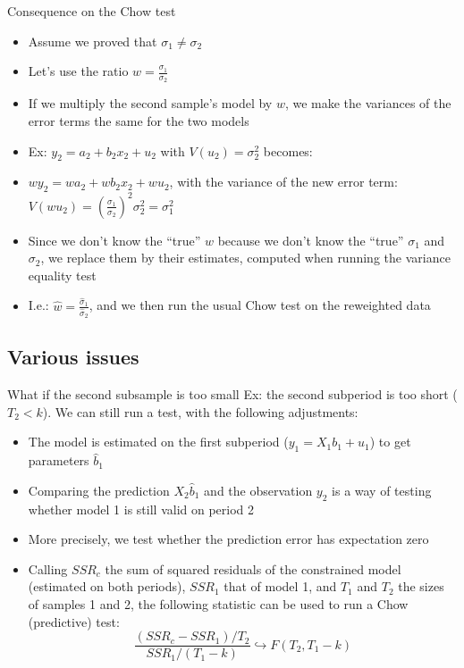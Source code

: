 \documentclass[aspectratio=169]{beamer}
\begin{document}
\begin{frame}{Consequence on the Chow test}
\begin{itemize}
    \item Assume we proved that $\sigma_1 \neq \sigma_2$
    \item Let's use the ratio $w = \frac{\sigma_1}{\sigma_2}$
    \item If we multiply the second sample's model by $w$, we make the variances of the error terms the same for the two models
    \item Ex: $y_2 = a_2 + b_2 x_2 + u_2$ with $V(u_2) = \sigma_2^2$ becomes:
    \item $w y_2 = w a_2 + w b_2 x_2 + w u_2$, with the variance of the new error term: $V(w u_2) = (\frac{\sigma_1}{\sigma_2})^2 \sigma_2^2 = \sigma_1^2$
    \item Since we don't know the ``true'' $w$ because we don't know the ``true'' $\sigma_1$ and $\sigma_2$, we replace them by their estimates, computed when running the variance equality test
    \item I.e.: $\hat{w} = \frac{\hat{\sigma}_1}{\hat{\sigma}_2}$, and we then run the usual Chow test on the reweighted data
\end{itemize}
\end{frame}

\subsection{Various issues}

\begin{frame}{What if the second subsample is too small}
Ex: the second subperiod is too short ($T_2 < k$). We can still run a test, with the following adjustments:

\begin{itemize}
    \item The model is estimated on the first subperiod ($y_1 = X_1 b_1 + u_1$) to get parameters $\hat{b}_1$
    \item Comparing the prediction $X_2\hat{b}_1$ and the observation $y_2$ is a way of testing whether model 1 is still valid on period 2
    \item More precisely, we test whether the prediction error has expectation zero
    \item Calling $SSR_c$ the sum of squared residuals of the constrained model (estimated on both periods), $SSR_1$ that of model 1, and $T_1$ and $T_2$ the sizes of samples 1 and 2, the following statistic can be used to run a Chow (predictive) test:
    \[
    \frac{(SSR_c - SSR_1)/T_2}{SSR_1/(T_1-k)} \hookrightarrow F(T_2, T_1-k)
    \]
\end{itemize}
\end{frame}
\end{document}
